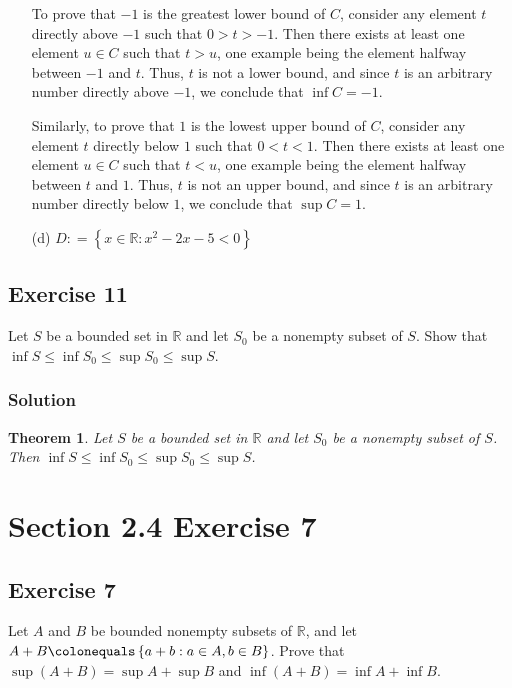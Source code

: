 \documentclass[12pt]{article}
\newtheorem*{thm}{Theorem}
\begin{document}
\begin{itemize}
To prove that $-1$ is the greatest lower bound of $C$, consider any element $t$ directly above $-1$ such that $0 > t > -1$. Then there exists at least one element $u \in C$ such that $t > u$, one example being the element halfway between $-1$ and $t$. Thus, $t$ is not a lower bound, and since $t$ is an arbitrary number directly above $-1$, we conclude that $\inf C = -1$.

Similarly, to prove that $1$ is the lowest upper bound of $C$, consider any element $t$ directly below $1$ such that $0 < t < 1$. Then there exists at least one element $u \in C$ such that $t < u$, one example being the element halfway between $t$ and $1$. Thus, $t$ is not an upper bound, and since $t$ is an arbitrary number directly below $1$, we conclude that $\sup C = 1$.
\item[(d)]$D \mathrel{\mathop:}= \left\{x \in \mathbb{R} : x^2 - 2x - 5 < 0\right\}$
\end{itemize}
\subsection*{Exercise 11}
Let $S$ be a bounded set in $\mathbb{R}$ and let $S_0$ be a nonempty subset of $S$. Show that $\inf S \leq \inf S_0 \leq \sup S_0 \leq \sup S$.

\subsubsection*{Solution}
\begin{thm}
Let $S$ be a bounded set in $\mathbb{R}$ and let $S_0$ be a nonempty subset of $S$. Then $\inf S \leq \inf S_0 \leq \sup S_0 \leq \sup S$.
\end{thm}

\section*{Section 2.4 Exercise 7}

\subsection*{Exercise 7}

Let $A$ and $B$ be bounded nonempty subsets of $\mathbb{R}$, and let $A + B \colonequals \left\{a + b : a \in A, b \in B\right\}$. Prove that $\sup\left(A + B\right) = \sup A + \sup B$ and $\inf \left(A + B\right) = \inf A + \inf B$.
\end{document}
